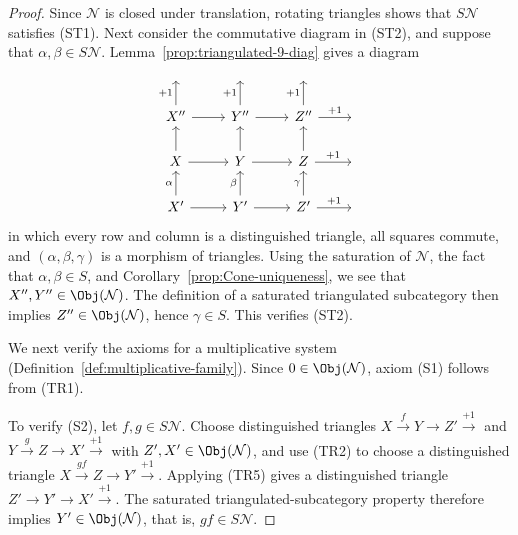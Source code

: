 \begin{proof}
	Since $\mathcal{N}$ is closed under translation, rotating triangles shows
	that $S\mathcal{N}$ satisfies (ST1). Next consider the commutative diagram
	in (ST2), and suppose that $\alpha, \beta \in S\mathcal{N}$.
	Lemma~\ref{prop:triangulated-9-diag} gives a diagram
	\[\begin{tikzcd}
		{} & {} & {} & {} \\
		X'' \arrow[u, "+1"] \arrow[r] & Y'' \arrow[u, "+1"] \arrow[r] & Z'' \arrow[u, "+1"] \arrow[r, "+1"] & {} \\
		X \arrow[r] \arrow[u] & Y \arrow[r] \arrow[u] & Z \arrow[r, "+1"] \arrow[u] & {}\\
		X' \arrow[r] \arrow[u, "\alpha"] & Y' \arrow[r] \arrow[u, "\beta"] & Z' \arrow[r, "+1"] \arrow[u, "\gamma"] & {}
	\end{tikzcd}\]
	in which every row and column is a distinguished triangle, all squares
	commute, and $(\alpha, \beta, \gamma)$ is a morphism of triangles. Using
	the saturation of $\mathcal{N}$, the fact that
	$\alpha, \beta \in S$, and Corollary~\ref{prop:Cone-uniqueness}, we see
	that $X'', Y'' \in \Obj(\mathcal{N})$. The definition of a saturated
	triangulated subcategory then implies
	$Z'' \in \Obj(\mathcal{N})$, hence $\gamma \in S$. This verifies (ST2).

	We next verify the axioms for a multiplicative system
	(Definition~\ref{def:multiplicative-family}). Since
	$0 \in \Obj(\mathcal{N})$, axiom (S1) follows from (TR1).

	To verify (S2), let $f, g \in S\mathcal{N}$. Choose distinguished
	triangles $X \xrightarrow{f} Y \to Z' \xrightarrow{+1}$ and
	$Y \xrightarrow{g} Z \to X' \xrightarrow{+1}$ with
	$Z', X' \in \Obj(\mathcal{N})$, and use (TR2) to choose a distinguished
	triangle $X \xrightarrow{gf} Z \to Y' \xrightarrow{+1}$. Applying (TR5)
	gives a distinguished triangle $Z' \to Y' \to X' \xrightarrow{+1}$.
	The saturated triangulated-subcategory property therefore implies
	$Y' \in \Obj(\mathcal{N})$, that is, $gf \in S\mathcal{N}$.


\end{proof}
